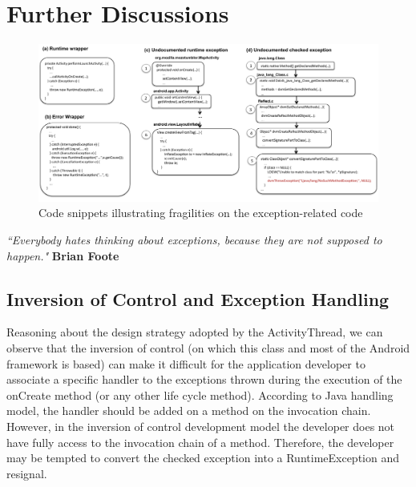 \documentclass[conference]{IEEEtran}
\begin{document}
\noindent {}


\section{Further Discussions}
\label{sec:disc}

\begin{figure} \centering \includegraphics[scale=0.55]{codeexamples.pdf}
\caption{Code snippets illustrating fragilities on the exception-related code} \label{fig:snippets} \end{figure}


\emph{``Everybody hates thinking about exceptions, because they are not supposed to happen."}
\textbf{Brian Foote} 

\subsection{Inversion of Control and Exception Handling}
Reasoning about the design strategy adopted by the ActivityThread,
we can observe that the inversion of control (on which this class and 
most of the Android framework is based) can make it difficult for the application developer to 
associate a specific handler to the exceptions thrown during the execution of the onCreate method (or any other life cycle method).
According to Java handling model, the handler should be added on a method on the invocation chain. 
However,  in the inversion of control development model the developer does not have fully access to 
the invocation chain of a method. Therefore, the developer may be tempted to convert the checked
 exception into a RuntimeException and resignal.
\end{document}
